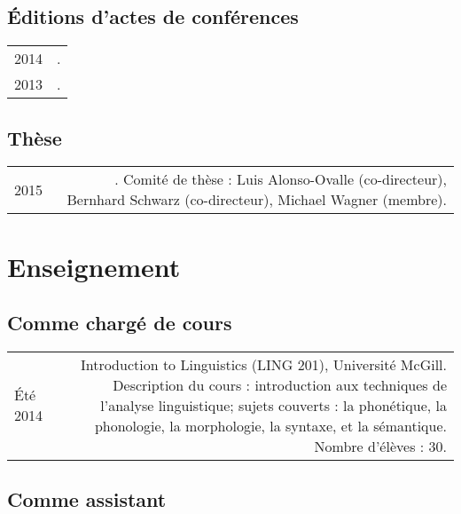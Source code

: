 \documentclass[11pt,a4paper,twoside,french]{article}
\makeatletter
\newcommand{\bodywidth}{0.77}
\newenvironment{cvsection}{%
  \setlength{\extrarowheight}{0.70ex}
  \begin{longtable}[l]{@{} L R @{}}
}{%
  \end{longtable}
}
\newcommand{\course}[3]{%
  \parbox[t]{\bodywidth\textwidth}{#1.\\ {\footnotesize Description du cours : #2.
      Nombre d'élèves : #3.}}
}
\makeatother
\begin{document}
\subsection*{Éditions d'actes de conférences}

\begin{cvsection}
  2014 & .\\
  2013 & .\\
\end{cvsection}

\subsection*{Thèse}

\begin{cvsection}
  2015 & . Comité de thèse : Luis Alonso-Ovalle (co-directeur), Bernhard Schwarz (co-directeur), Michael Wagner (membre).\\
\end{cvsection}

\section*{Enseignement}

\subsection*{Comme chargé de cours}

\begin{cvsection}
  Été 2014 & \course{Introduction to Linguistics (LING 201), Université McGill}
  {introduction aux techniques de l'analyse linguistique; sujets couverts : la phonétique, la phonologie, la morphologie, la syntaxe, et la sémantique}
  {30}
\end{cvsection}

\subsection*{Comme assistant}
\end{document}
